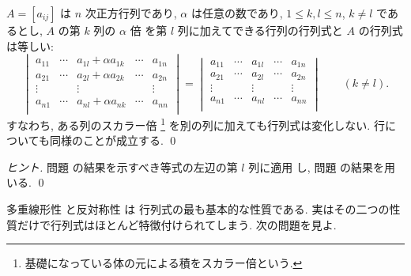 \documentclass[12pt,twoside]{jarticle}
\begin{document}
\begin{question}[ある列のスカラー倍を別の列に加えた場合]
  $A=[a_{ij}]$ は $n$ 次正方行列であり, $\alpha$ は任意の数であり, 
  $1\le k,l\le n$, $k\ne l$ であるとし, $A$ の第 $k$ 列の $\alpha$ 倍
  を第 $l$ 列に加えてできる行列の行列式と $A$ の行列式は等しい:
  \begin{equation*}
    \begin{vmatrix}
     a_{11} & \cdots & a_{1l} + \alpha a_{1k} & \cdots & a_{1n} \\
     a_{21} & \cdots & a_{2l} + \alpha a_{2k} & \cdots & a_{2n} \\
     \vdots &        & \vdots                 &        & \vdots \\
     a_{n1} & \cdots & a_{nl} + \alpha a_{nk} & \cdots & a_{nn} \\
    \end{vmatrix}
    = 
    \begin{vmatrix}
     a_{11} & \cdots & a_{1l} & \cdots & a_{1n} \\
     a_{21} & \cdots & a_{2l} & \cdots & a_{2n} \\
     \vdots &        & \vdots &        & \vdots \\
     a_{n1} & \cdots & a_{nl} & \cdots & a_{nn} \\
    \end{vmatrix}
    \qquad (k\ne l).
  \end{equation*}
  すなわち, ある列のスカラー倍%
  \footnote{基礎になっている体の元による積をスカラー倍という.}%
  を別の列に加えても行列式は変化しない.
  行についても同様のことが成立する.
  \qed
\end{question}

\begin{proof}[ヒント]
  問題  の結果を示すべき等式の左辺の第 $l$ 列に適用
  し, 問題  の結果を用いる.
  \qed
\end{proof}

\medskip

多重線形性  と反対称性  は
行列式の最も基本的な性質である.
実はその二つの性質だけで行列式はほとんど特徴付けられてしまう.
次の問題を見よ.
\end{document}
